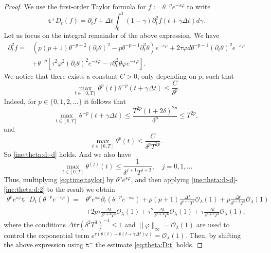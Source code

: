 \documentclass[10pt,a4paper]{amsart}
\newcommand{\trm}{\mathtt t^-}
\newcommand{\trp}{\mathtt t^+}
\begin{document}
\begin{proof}
We use the first-order Taylor formula for  $f:=\theta^{-p}e^{-s\varphi}$ to write
\begin{equation}\label{eq:time:taylor}
    \trp D_{t}(f)=\partial_{t}f+\Delta t\int_{0}^{1}(1-\gamma)\partial_{t}^{2}f(t+\gamma \Delta t)d\gamma.
\end{equation}
Let us focus on the integral remainder of the above expression. We have
\begin{equation*}
\begin{aligned}
    \partial_{t}^{2}f=&(p(p+1)\theta^{-p-2}(\partial_{t}\theta)^{2}-p\theta^{-p-1}\partial_{t}^{2}\theta)e^{-s\varphi}+2\tau\varphi d\theta^{-p-1}(\partial_{t}\theta)^{2}e^{-s\varphi}\\
    &+\theta^{-p}\left[ \tau^{2}\varphi^{2}(\partial_{t}\theta)^{2}e^{-s\varphi}-\tau\partial_{t}^{2}\theta\varphi e^{-s\varphi}\right].
      \end{aligned}
\end{equation*}
We notice that there exists a constant $C>0$, only depending on $p$, such that
\begin{equation}\label{ine:theta:d:-d}
    \max_{t\in [0,T]} \theta^{p}(t)\theta^{-p}(t+\gamma\Delta t)\leq \frac{C}{\delta^{p}}.
\end{equation} Indeed, for $p\in\{0,1,2,\ldots\}$ it follows that
\begin{equation}\label{ine:max:theta}
    \max_{t\in[0,T]}\theta^{-p}(t+\gamma\Delta t)\leq   \frac{T^{2p}(1+2\delta)^{2p}}{4^{p}}\leq T^{2p},
    \end{equation}
    and 
    \begin{equation}\label{ine:theta:d}
    \max_{t\in[0,T]} \theta^{p}(t)\leq \frac{C}{\delta^{p}T^{2p}}.
\end{equation} 
So \eqref{ine:theta:d:-d} holds. And we also have
\begin{equation}\label{ine:theta:d:2}
    \max_{t\in[0,T]}\theta^{(j)}(t)\leq \frac{1}{\delta^{j+1}T^{j+2}},\quad j=0,1,\ldots
\end{equation}
Thus, multiplying \eqref{eq:time:taylor} by $\theta^{p}e^{s\varphi}$, and then applying \eqref{ine:theta:d:-d}-\eqref{ine:theta:d:2} to the result we obtain
\begin{equation}
\begin{aligned}
    \theta^{p}e^{s\varphi}\trp D_{t}(\theta^{-p}e^{-s\varphi})=&\theta^{p}e^{s\varphi}\partial_{t}(\theta^{-p}e^{-s\varphi})+p(p+1)\frac{\Delta t}{\delta^{p+4}T^{2}}\mathcal{O}_{\lambda}(1)+p\frac{\Delta t}{\delta^{p+3}T^{2}}\mathcal{O}_{\lambda}(1)\\
    &+2p\tau\frac{\Delta t}{\delta^{p+4}T^{4}}\mathcal{O}_{\lambda}(1)+\tau^{2} \frac{\Delta t}{\delta^{p+4}T^{6}}\mathcal{O}_{\lambda}(1)+\tau\frac{\Delta t}{\delta^{p+3}T^{4}}\mathcal{O}_{\lambda}(1),
\end{aligned}
\end{equation}
where the conditions $\Delta t\tau(\delta^{2} T^{3})^{-1}\leq 1$ and $\|\varphi\|_{\infty}=\mathcal{O}_{\lambda}(1)$ are used to control the exponential term $e^{\tau(\theta(t)-\theta(t+\gamma\Delta t)\varphi)}=\mathcal{O}_{\lambda}(1)$. Then, by shifting the above expression using $\trm$ the estimate \eqref{eq:theta:D:t} holds.
\end{proof}
\end{document}
